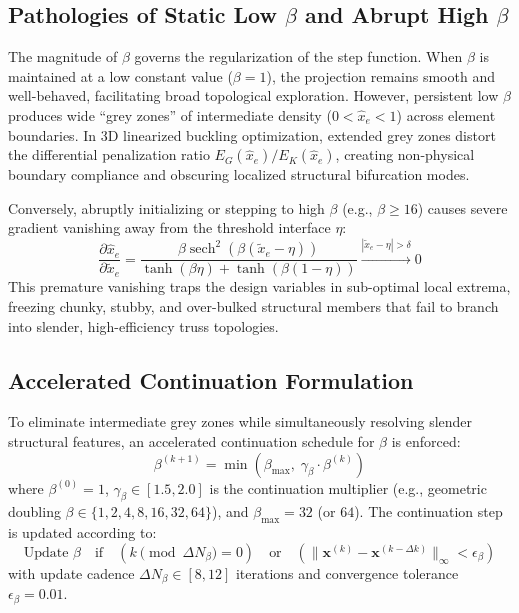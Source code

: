 \documentclass[11pt, a4paper]{article}
\begin{document}
\subsection{Pathologies of Static Low \texorpdfstring{$\beta$}{beta} and Abrupt High \texorpdfstring{$\beta$}{beta}}
The magnitude of $\beta$ governs the regularization of the step function. When $\beta$ is maintained at a low constant value ($\beta = 1$), the projection remains smooth and well-behaved, facilitating broad topological exploration. However, persistent low $\beta$ produces wide ``grey zones'' of intermediate density ($0 < \hat{x}_e < 1$) across element boundaries. In 3D linearized buckling optimization, extended grey zones distort the differential penalization ratio $E_G(\hat{x}_e) / E_K(\hat{x}_e)$, creating non-physical boundary compliance and obscuring localized structural bifurcation modes.

Conversely, abruptly initializing or stepping to high $\beta$ (e.g., $\beta \ge 16$) causes severe gradient vanishing away from the threshold interface $\eta$:
\begin{equation}
\frac{\partial \hat{x}_e}{\partial \tilde{x}_e} = \frac{\beta \operatorname{sech}^2(\beta(\tilde{x}_e - \eta))}{\tanh(\beta \eta) + \tanh(\beta(1 - \eta))} \xrightarrow{|\tilde{x}_e - \eta| > \delta} 0
\end{equation}
This premature vanishing traps the design variables in sub-optimal local extrema, freezing chunky, stubby, and over-bulked structural members that fail to branch into slender, high-efficiency truss topologies.

\subsection{Accelerated Continuation Formulation}
To eliminate intermediate grey zones while simultaneously resolving slender structural features, an accelerated continuation schedule for $\beta$ is enforced:
\begin{equation}
\beta^{(k+1)} = \min\left( \beta_{\max}, \; \gamma_\beta \cdot \beta^{(k)} \right)
\end{equation}
where $\beta^{(0)} = 1$, $\gamma_\beta \in [1.5, 2.0]$ is the continuation multiplier (e.g., geometric doubling $\beta \in \{1, 2, 4, 8, 16, 32, 64\}$), and $\beta_{\max} = 32$ (or $64$). The continuation step is updated according to:
\begin{equation}
\text{Update } \beta \quad \text{if} \quad \left( k \pmod{\Delta N_\beta} = 0 \right) \quad \text{or} \quad \left( \|\mathbf{x}^{(k)} - \mathbf{x}^{(k - \Delta k)}\|_\infty < \epsilon_\beta \right)
\end{equation}
with update cadence $\Delta N_\beta \in [8, 12]$ iterations and convergence tolerance $\epsilon_\beta = 0.01$.
\end{document}
